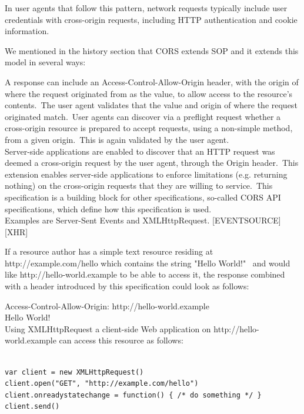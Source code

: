\documentclass[a4paper,12pt]{paper}
\begin{document}
In user agents that follow this pattern, network requests typically include user credentials with cross-origin requests, including HTTP authentication and cookie information.

We mentioned in the history section that CORS extends SOP and it extends this model in several ways:

A response can include an Access-Control-Allow-Origin header, with the origin of where the request originated from as the value, to allow access to the resource's contents.\
The user agent validates that the value and origin of where the request originated match.\
User agents can discover via a preflight request whether a cross-origin resource is prepared to accept requests, using a non-simple method, from a given origin.\
This is again validated by the user agent.\\

Server-side applications are enabled to discover that an HTTP request was deemed a cross-origin request by the user agent, through the Origin header.\
This extension enables server-side applications to enforce limitations (e.g. returning nothing) on the cross-origin requests that they are willing to service.\
This specification is a building block for other specifications, so-called CORS API specifications, which define how this specification is used.\\
Examples are Server-Sent Events and XMLHttpRequest. [EVENTSOURCE] [XHR]

If a resource author has a simple text resource residing at http://example.com/hello which contains the string "Hello World!" \
and would like http://hello-world.example to be able to access it, the response combined with a header introduced by this specification could look as follows:\

Access-Control-Allow-Origin: http://hello-world.example\\

Hello World!\\

Using XMLHttpRequest a client-side Web application on http://hello-world.example can access this resource as follows:\\
\begin{verbatim}

var client = new XMLHttpRequest()
client.open("GET", "http://example.com/hello")
client.onreadystatechange = function() { /* do something */ }
client.send()
 
\end{verbatim}
\end{document}
